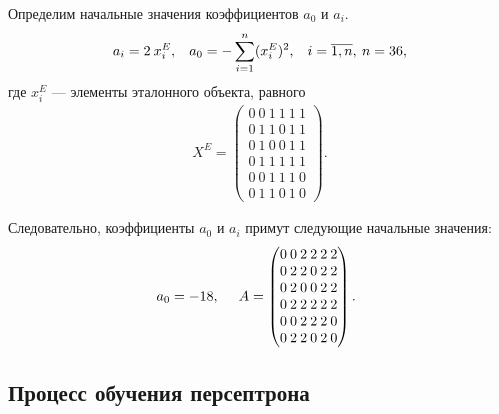 Определим начальные значения коэффициентов $a_0$ и $a_i$.
\begin{equation*}
  a_i = 2 \: x_i^E, \hspace{3mm} a_0 = - \sum_{i=1}^{n} (x_i^E)^2, \hspace{3mm} i = \overline{1,n}, \: n=36,
\end{equation*}
где $x_i^E$ --- элементы эталонного объекта, равного
\[
  \begin{array}{lc}
    X^E = 
    \left(
      \begin{matrix}
        0 \: 0 \: 1 \: 1 \: 1 \: 1 \\
        0 \: 1 \: 1 \: 0 \: 1 \: 1 \\
        0 \: 1 \: 0 \: 0 \: 1 \: 1 \\
        0 \: 1 \: 1 \: 1 \: 1 \: 1 \\
        0 \: 0 \: 1 \: 1 \: 1 \: 0 \\
        0 \: 1 \: 1 \: 0 \: 1 \: 0
      \end{matrix}
    \right).
  \end{array}
\]

Следовательно, коэффициенты $a_0$ и $a_i$ примут следующие начальные значения:
\begin{align*}
  a_0 = -18, \hspace{3mm}
  \begin{array}{lc}
    A = 
    \left(
      \begin{matrix}
        0 \: 0 \: 2 \: 2 \: 2 \: 2 \\
        0 \: 2 \: 2 \: 0 \: 2 \: 2 \\
        0 \: 2 \: 0 \: 0 \: 2 \: 2 \\
        0 \: 2 \: 2 \: 2 \: 2 \: 2 \\
        0 \: 0 \: 2 \: 2 \: 2 \: 0 \\
        0 \: 2 \: 2 \: 0 \: 2 \: 0
      \end{matrix}
    \right).
  \end{array}
\end{align*}


\newpage
\subsection{Процесс обучения персептрона}

